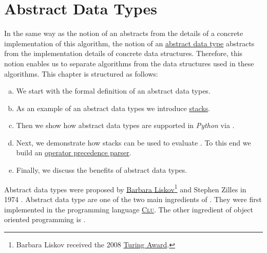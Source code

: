 \chapter{Abstract Data Types}
In the same way as the notion of an  abstracts from the details of a concrete
implementation of this algorithm, the notion of an \href{https://en.wikipedia.org/wiki/Abstract_data_type}{abstract data type} abstracts from the implementation
details of concrete data structures.  Therefore, this notion enables us to separate algorithms from the data
structures used in these algorithms.  This chapter is structured as follows:
\begin{enumerate}[(a)]
\item We start with the formal definition of an abstract data types.  
\item As an example of an abstract data types we introduce
      \href{https://en.wikipedia.org/wiki/Stack_(abstract_data_type)}{stacks}. 
\item Then we show how abstract data types are supported in \textsl{Python} via .  
\item Next, we demonstrate how stacks can be used to evaluate .  To this end we build an
      \href{https://en.wikipedia.org/wiki/Operator-precedence_parser}{operator precedence parser}. 
\item Finally, we discuss the benefits of abstract data types.
\end{enumerate}
Abstract data types were proposed by 
\href{https://en.wikipedia.org/wiki/Barbara_Liskov}{Barbara Liskov}\footnote{
  Barbara Liskov received the 2008 \href{https://en.wikipedia.org/wiki/Turing_Award}{Turing Award}.
} 
and Stephen Zilles in 1974 \cite{liskov:1974}.  Abstract data type are one of the two main ingredients of
.  They were first implemented in the programming language
\href{https://en.wikipedia.org/wiki/CLU_(programming_language)}{\textsc{Clu}}. 
The other ingredient of object oriented programming is .

